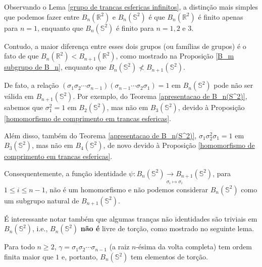 	\par\vspace{0.3cm} Observando o Lema \eqref{grupo de trancas esfericas infinitos}, a distinção mais simples que podemos fazer entre $B_n(\mathbb{R}^2)$ e $B_n(\mathbb{S}^2)$ é que $B_n(\mathbb{R}^2)$ é finito apenas para $n=1$, enquanto que $B_n(\mathbb{S}^2)$ é finito para $n=1,2$ e $3$.
	\par\vspace{0.3cm} Contudo, a maior diferença entre esses dois grupos (ou famílias de grupos) é o fato de que $B_n(\mathbb{R}^2)<B_{n+1}(\mathbb{R}^2)$, como mostrado na Proposição \eqref{B_m subgrupo de B_n}, enquanto que $B_n(\mathbb{S}^2)\nless B_{n+1}(\mathbb{S}^2)$.
	\par\vspace{0.3cm} De fato, a relação $(\sigma_1\sigma_2\cdots\sigma_{n-1})(\sigma_{n-1}\cdots\sigma_2\sigma_1) = 1$ em $B_n(\mathbb{S}^2)$ pode não ser válida em $B_{n+1}(\mathbb{S}^2)$. Por exemplo, do Teorema \eqref{apresentacao de B_n(S^2)}, sabemos que $\sigma_1^2 = 1$ em $B_2(\mathbb{S}^2)$, mas não em $B_3(\mathbb{S}^2)$, devido à Proposição \eqref{homomorfismo de comprimento em trancas esfericas}.
	\par\vspace{0.3cm} Além disso, também do Teorema \eqref{apresentacao de B_n(S^2)}, $\sigma_1\sigma_2^2\sigma_1 = 1$ em $B_3(\mathbb{S}^2)$, mas não em $B_4(\mathbb{S}^2)$, de novo devido à Proposição \eqref{homomorfismo de comprimento em trancas esfericas}.
	\par\vspace{0.3cm} Consequentemente, a função identidade $\displaystyle{\psi: \underset{\sigma_i\mapsto\sigma_i}{B_n(\mathbb{S}^2)\to B_{n+1}(\mathbb{S}^2)}}$, para $1\leq i\leq n-1$, não é um homomorfismo e não podemos considerar $B_n(\mathbb{S}^2)$ como um subgrupo natural de $B_{n+1}(\mathbb{S}^2)$.
	\par\vspace{0.3cm} É interessante notar também que algumas tranças não identidades são triviais em $B_n(\mathbb{S}^2)$, i.e., $B_n(\mathbb{S}^2)$ \textbf{não é} livre de torção, como mostrado no seguinte lema.
	
	\begin{lemma}
		\label{B_(S^2) nao livre de torcao}
		Para todo $n\geq2$, $\gamma = \sigma_1\sigma_2\cdots\sigma_{n-1}$ (a raiz $n$-ésima da volta completa) tem ordem finita maior que $1$ e, portanto, $B_n(\mathbb{S}^2)$ tem elementos de torção.
	\end{lemma}
	
